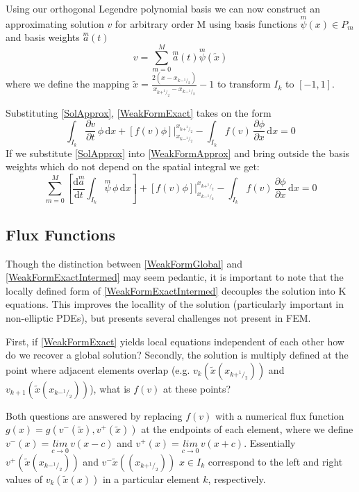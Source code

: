 \documentclass[letterpaper]{article}
\begin{document}
Using our orthogonal Legendre polynomial basis we can now construct an approximating solution $v$ for arbitrary order M using basis functions $\overset{m}{\psi}(x) \in P_m$ and basis weights $\overset{m}{a}(t)$
	\begin{equation}\label{SolApprox}
	v = \sum_{m=0}^M \overset{m}{a}(t)\overset{m}{\psi}(\tilde{x})
	\end{equation}
where we define the mapping $\tilde{x} = \frac{2(x-x_{k-^1\!/_2})}{x_{k+^1\!/_2}-x_{k-^1\!/_2}}-1$ to transform $I_k$ to $[-1,1]$.

Substituting \eqref{SolApprox}, \eqref{WeakFormExact} takes on the form
	\begin{equation}\label{WeakFormApprox}
	\int_{I_k}\! \frac{\partial v}{\partial t} \,\phi \,\mathrm{d}x +
	[f(v)\phi] \Big\rvert_{x_{k-^1\!/_2}}^{x_{k+^1\!/_2}} -
	\int_{I_k}\! f(v) \,\frac{\partial \phi}{\partial x} \,\mathrm{d}x = 0
	\end{equation}
If we substitute \eqref{SolApprox} into \eqref{WeakFormApprox} and bring outside the basis weights which do not depend on the spatial integral we get:
	\begin{equation}\label{WeakFormLinearIntermed}
	\sum_{m=0}^M \left[ \frac{\mathrm{d}\overset{m}{a}}{\mathrm{d} t} \int_{I_k}\! \overset{m}{\psi} \,\phi \,\mathrm{d}x \right] + 
	[f(v)\phi] \Big\rvert_{x_{k-^1\!/_2}}^{x_{k+^1\!/_2}} -
	 \int_{I_k}\! f(v) \,\frac{\partial \phi}{\partial x} \,\mathrm{d}x = 0
	\end{equation}

\subsection{Flux Functions}
Though the distinction between \eqref{WeakFormGlobal} and \eqref{WeakFormExactIntermed} may seem pedantic, it is important to note that the locally defined form of \eqref{WeakFormExactIntermed} decouples the solution into K equations. This improves the locallity of the solution (particularly important in non-elliptic PDEs), but presents several challenges not present in FEM.

First, if \eqref{WeakFormExact} yields local equations independent of each other how do we recover a global solution? Secondly, the solution is multiply defined at the point where adjacent elements overlap (e.g. $v_k(\tilde{x}(x_{k+^1\!/_2}))$ and $v_{k+1}(\tilde{x}(x_{k-^1\!/_2}))$\;), what is $f(v)$ at these points?

Both questions are answered by replacing $f(v)$ with a numerical flux function $g(x) = g(v^-(\tilde{x}),v^+(\tilde{x}))$ at the endpoints of each element, where we define $v^-(x) = \underset{c \to 0}{lim} \,v(x-c)$ and $v^+(x) = \underset{c \to 0}{lim} \,v(x+c)$. Essentially $v^+(\tilde{x}(x_{k-^1\!/_2}))$ and $v^-\tilde{x}((x_{k+^1\!/_2}))$ $x \in I_k$ correspond to the left and right values of $v_k(\tilde{x}(x))$ in a particular element $k$, respectively.
\end{document}
